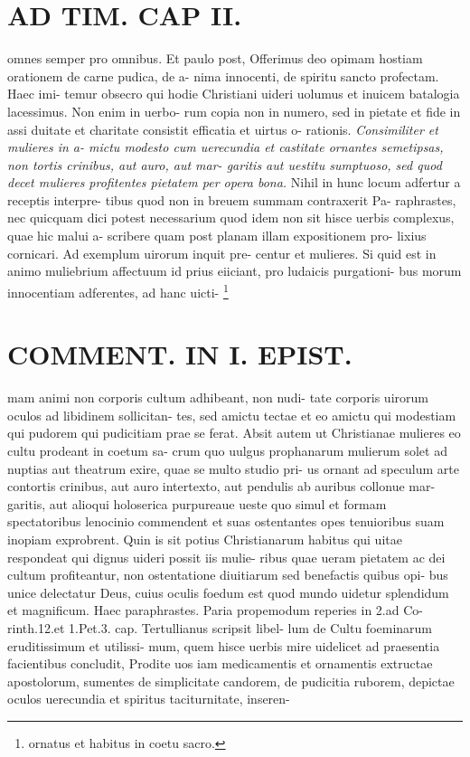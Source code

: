 \documentclass{article}
\begin{document}
\begin{pages}
\section*{AD TIM. CAP II. }
\marginpar{[ p.119 ]}\pstart omnes semper pro omnibus. Et paulo post, Offerimus deo opimam hostiam orationem de carne pudica, de a- nima innocenti, de spiritu sancto profectam. Haec imi- temur obsecro qui hodie Christiani uideri uolumus et inuicem batalogia lacessimus. Non enim in uerbo- rum copia non in numero, sed in pietate et fide in assi duitate et charitate consistit efficatia et uirtus o- rationis.  \pend
\textit{Consimiliter et mulieres in a- mictu modesto cum uerecundia et castitate ornantes semetipsas, non tortis crinibus, aut auro, aut mar- garitis aut uestitu sumptuoso, sed quod decet mulieres profitentes pietatem per opera bona. }\pstart Nihil in hunc locum adfertur a receptis interpre- tibus quod non in breuem summam contraxerit Pa- raphrastes, nec quicquam dici potest necessarium quod idem non sit hisce uerbis complexus, quae hic malui a- scribere quam post planam illam expositionem pro- lixius cornicari. Ad exemplum uirorum inquit pre- centur et mulieres. Si quid est in animo muliebrium affectuum id prius eiiciant, pro ludaicis purgationi- bus morum innocentiam adferentes, ad hanc uicti-  \pend\footnote{\footnotesizeMulierum ornatus et habitus in coetu sacro. }
\section*{COMMENT. IN I. EPIST. }\pstart mam animi non corporis cultum adhibeant, non nudi- tate corporis uirorum oculos ad libidinem sollicitan- tes, sed amictu tectae et eo amictu qui modestiam qui pudorem qui pudicitiam prae se ferat. Absit autem ut Christianae mulieres eo cultu prodeant in coetum sa- crum quo uulgus prophanarum mulierum solet ad nuptias aut theatrum exire, quae se multo studio pri- us ornant ad speculum arte contortis crinibus, aut auro intertexto, aut pendulis ab auribus collonue mar- garitis, aut alioqui holoserica purpureaue ueste quo simul et formam spectatoribus lenocinio commendent et suas ostentantes opes tenuioribus suam inopiam exprobrent. Quin is sit potius Christianarum habitus qui uitae respondeat qui dignus uideri possit iis mulie- ribus quae ueram pietatem ac dei cultum profiteantur, non ostentatione diuitiarum sed benefactis quibus opi- bus unice delectatur Deus, cuius oculis foedum est quod mundo uidetur splendidum et magnificum. Haec paraphrastes. Paria propemodum reperies in 2.ad Co- rinth.12.et 1.Pet.3. cap. Tertullianus scripsit libel- lum de Cultu foeminarum eruditissimum et utilissi- mum, quem hisce uerbis mire uidelicet ad praesentia facientibus concludit, Prodite uos iam medicamentis et ornamentis extructae apostolorum, sumentes de simplicitate candorem, de pudicitia ruborem, depictae oculos uerecundia et spiritus taciturnitate, inseren-  \pend

\end{pages}
\end{document}

